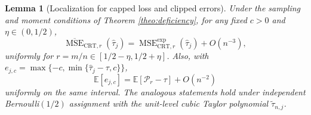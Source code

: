\documentclass{article}
\newcommand{\EEE}{\mathbb{E}}
\newcommand{\htau}{\hat{\tau}}
\DeclareMathOperator{\MSE}{MSE}
\newcommand{\CRT}{\mathrm{CRT}}
\newcommand{\MSEexp}{\MSE^{\mathrm{exp}}}
\theoremstyle{plain}
\newtheorem{lemm}[prop]{Lemma}
\theoremstyle{definition}
\theoremstyle{remark}
\begin{document}
\begin{lemm}[Localization for capped loss and clipped errors]
\label{lemm:localization}
Under the sampling and moment conditions of Theorem
\ref{theo:deficiency}, for any fixed $c>0$ and
$\eta\in(0,1/2)$,
\begin{equation}
\label{eq:capped_transfer}
\overline{\operatorname{MSE}}_{\CRT,r}(\htau_j)
=\MSEexp_{\CRT,r}(\htau_j)+O(n^{-3}),
\end{equation}
uniformly for $r=m/n\in[1/2-\eta,1/2+\eta]$. Also, with
$e_{j,c}=\max\{-c,\min\{\htau_j-\tau,c\}\}$,
\begin{equation}
\label{eq:clipped_bias_transfer}
\EEE[e_{j,c}]=\EEE[\mathcal P_r-\tau]+O(n^{-2})
\end{equation}
uniformly on the same interval. The analogous statements hold under
independent Bernoulli$(1/2)$ assignment with the unit-level cubic
Taylor polynomial $\tilde\tau_{n,j}$.
\end{lemm}
\end{document}
